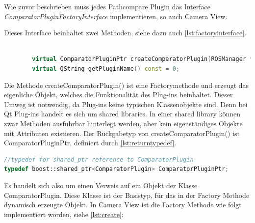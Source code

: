 Wie zuvor beschrieben muss jedes Pathcompare Plugin das Interface
\textit{ComparatorPluginFactoryInterface} implementieren, so auch Camera View.

Dieses Interface beinhaltet zwei Methoden, siehe dazu auch
\autoref{lst:factoryinterface}.

\begin{lstlisting}[caption=ROS transformation message, language=C++, basicstyle=\footnotesize, label=lst:factoryinterface]

        virtual ComparatorPluginPtr createComperatorPlugin(ROSManager * ros_manager, QWidget *tab_widget) const = 0;
        virtual QString getPluginName() const = 0;

\end{lstlisting}

Die Methode createComparatorPlugin() ist eine Factorymethode und erzeugt das
eigenliche Objekt, welches die Funktionalität des Plug-ins beinhaltet. Dieser
Umweg ist notwendig, da Plug-ins keine typischen Klassenobjekte sind. Denn bei
Qt Plug-ins handelt es sich um shared libraries. In einer shared library können
zwar Methoden ausführbar hinterlegt werden, aber kein eigenständiges Objekte
mit Attributen existieren. Der Rückgabetyp von createComparatorPlugin() ist
ComparatorPluginPtr, definiert durch \autoref{lst:returntypedef}.

\begin{lstlisting}[caption=ROS transformation message, language=C++, basicstyle=\footnotesize, label=lst:returntypedef]
//typedef for shared_ptr reference to ComparatorPlugin
typedef boost::shared_ptr<ComparatorPlugin> ComparatorPluginPtr;
\end{lstlisting}

Es handelt sich also um einen Verweis auf ein Objekt der Klasse
ComparatorPlugin. Diese Klasse ist der Basistyp, für das in der Factory Methode
dynamisch erzeugte Objekt. In Camera View ist die Factory Methode wie folgt
implementiert worden, siehe \autoref{lst:create}:

